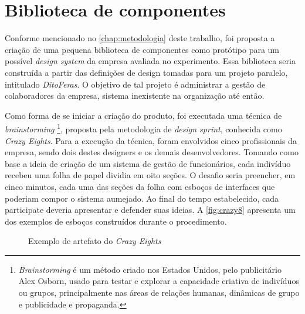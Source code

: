 
\chapter{Biblioteca de componentes}
\label{chap:bibComponentes}

Conforme mencionado no \autoref{chap:metodologia} deste trabalho, foi proposta a criação de uma pequena biblioteca de componentes como protótipo para um possível \textit{design system} da empresa avaliada no experimento. Essa biblioteca seria construída a partir das definições de design tomadas para um projeto paralelo, intitulado \textit{DitoFeras}. O objetivo de tal projeto é administrar a gestão de colaboradores da empresa, sistema inexistente na organização até então.

Como forma de se iniciar a criação do produto, foi executada uma técnica de \textit{brainstorming} \footnote{\textit{Brainstorming} é um método criado nos Estados Unidos, pelo publicitário Alex Osborn, usado para testar e explorar a capacidade criativa de indivíduos ou grupos, principalmente nas áreas de relações humanas, dinâmicas de grupo e publicidade e propaganda.}, proposta pela metodologia de \textit{design sprint}, conhecida como \textit{Crazy Eights}. Para a execução da técnica, foram envolvidos cinco profissionais da empresa, sendo dois destes designers e os demais desenvolvedores. Tomando como base a ideia de criação de um sistema de gestão de funcionários, cada indivíduo recebeu uma folha de papel dividia em oito seções. O desafio seria preencher, em cinco minutos, cada uma das seções da folha com esboços de interfaces que poderiam compor o sistema aumejado. Ao final do tempo estabelecido, cada participate deveria apresentar e defender suas ideias. A \autoref{fig:crazy8} apresenta um dos exemplos de esboços construídos durante o procedimento.

\begin{figure}
  \caption{Exemplo de artefato do \textit{Crazy Eights}}
  \label{fig:crazy8}
\end{figure}

